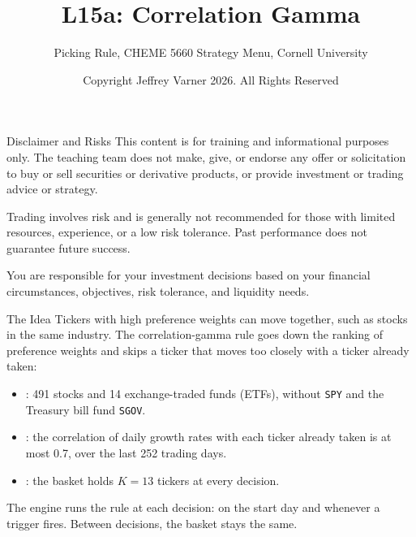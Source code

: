 \documentclass[aspectratio=169,11pt]{beamer}
\title{\texorpdfstring{{\vnheavy L15a}}{L15a}: Correlation Gamma}
\subtitle{Picking Rule, CHEME 5660 Strategy Menu, Cornell University}
\author{Copyright Jeffrey Varner 2026. All Rights Reserved}
\begin{document}
\vntitlepage

\begin{frame}{Disclaimer and Risks}
  \vspace{0.6em}
  \textbf{} This content is for training and informational
  purposes only. The teaching team does not make, give, or endorse any offer or
  solicitation to buy or sell securities or derivative products, or provide
  investment or trading advice or strategy.

  \vspace{1.1em}
  \textbf{} Trading involves risk and is generally not recommended for
  those with limited resources, experience, or a low risk tolerance. Past
  performance does not guarantee future success.

  \vspace{1.1em}
  \textbf{} You are responsible for your investment decisions
  based on your financial circumstances, objectives, risk tolerance, and
  liquidity needs.
\end{frame}

\begin{frame}{The Idea}
  \vspace{0.3em}
  Tickers with high preference weights can move together, such as stocks in the same industry. The
  correlation-gamma rule goes down the ranking of preference weights and skips a ticker that moves too closely
  with a ticker already taken:
  \begin{itemize}\setlength{\itemsep}{0.5em}
    \item {}: 491 stocks and 14 exchange-traded funds (ETFs), without \texttt{SPY} and the Treasury bill fund \texttt{SGOV}.
    \item {}: the correlation of daily growth rates with each ticker already taken is at most 0.7, over the last 252 trading days.
    \item {}: the basket holds $K=13$ tickers at every decision.
  \end{itemize}

  \vspace{0.5em}
  The engine runs the rule at each decision: on the start day and whenever a trigger fires. Between decisions, the basket stays the same.
\end{frame}
\end{document}
